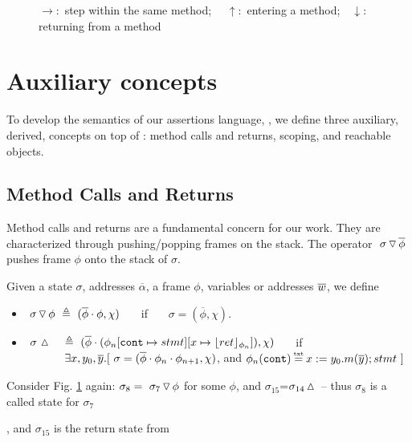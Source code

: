 {\begin{figure}[htb]
\begin{tabular}{|c|}
\end{tabular}
   \caption{$\rightarrow$:\  step within the same method; \ \ $\uparrow$:\    entering a method;\ \  $\downarrow$:  returning from a method}
   \label{fig:UpSemantics}
 \end{figure}
 

\section{Auxiliary concepts}
\label{s:auxiliary}

{To develop the semantics of our assertions language, \AssertLang, we   {define} three auxiliary, {derived}, concepts on  top of  \LangOO: {method calls and returns, scoping}, and reachable objects.}

\subsection{ Method Calls and Returns}
 
Method calls and returns are a fundamental concern for our work. 
They are characterized through pushing/popping   frames on the stack.  
The operator   $  \ {\sigma} \, {\triangledown}\, \overline{\phi} $ pushes 
frame $\phi$ onto the stack of $\sigma$.
 
 

\begin{definition}
\label{def:push:frame}
Given a state $\sigma$, addresses $\overline \alpha$, a frame $\phi$,  variables or addresses $\overline {w}$, we define
\begin{itemize}
\item
 $  \ {\sigma} \, {\triangledown}\, {\phi}  \ \triangleq \ ({\overline{\phi}\cdot\phi}, \chi)$ \ \ \  if \ \ \  $\sigma=(\overline{\phi}, \chi)$.
\item
$ \ \sigma\, \popSymbol \ \ \  \triangleq\   { (\overline{\phi}\cdot (\phi_n[\prg{cont}\mapsto stmt][x \mapsto \interpret {\phi_n}{ret}]), \chi)}$ \ \ \  if \\
 $\strut \hspace{1.2cm}  \exists x, y_0, \overline y. [ \ \sigma=(\overline{\phi}\cdot\phi_n\cdot\phi_{n+1}, \chi)$, and $\phi_n(\prg{cont})\txteq x:= y_0.m(\overline y); stmt \ ]$
\end{itemize}
 \end{definition}

Consider Fig. \ref{fig:UpSemantics} again: $\sigma_8 =  \ {\sigma_7} \, {\triangledown}\, {\phi} $ for some $\phi$, and  $\sigma_{15}$=$\sigma_{14} \, {\vartriangle}\,$
--  thus $\sigma_8$ is a called state for 
 $\sigma_7$}, and  $\sigma_{15}$ is the return state from 
